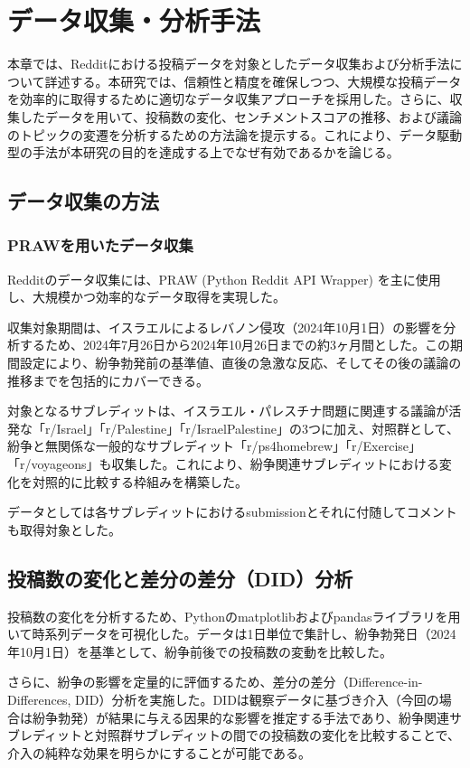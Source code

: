 \documentclass[11pt, a4j]{jreport}
\begin{document}
    \chapter{データ収集・分析手法}
    本章では、Redditにおける投稿データを対象としたデータ収集および分析手法について詳述する。本研究では、信頼性と精度を確保しつつ、大規模な投稿データを効率的に取得するために適切なデータ収集アプローチを採用した。さらに、収集したデータを用いて、投稿数の変化、センチメントスコアの推移、および議論のトピックの変遷を分析するための方法論を提示する。これにより、データ駆動型の手法が本研究の目的を達成する上でなぜ有効であるかを論じる。

    \section{データ収集の方法}
    \subsection{PRAWを用いたデータ収集}
    Redditのデータ収集には、PRAW (Python Reddit API Wrapper) を主に使用し、大規模かつ効率的なデータ取得を実現した。

    収集対象期間は、イスラエルによるレバノン侵攻（2024年10月1日）の影響を分析するため、2024年7月26日から2024年10月26日までの約3ヶ月間とした。この期間設定により、紛争勃発前の基準値、直後の急激な反応、そしてその後の議論の推移までを包括的にカバーできる。

    対象となるサブレディットは、イスラエル・パレスチナ問題に関連する議論が活発な「r/Israel」「r/Palestine」「r/IsraelPalestine」の3つに加え、対照群として、紛争と無関係な一般的なサブレディット「r/ps4homebrew」「r/Exercise」「r/voyageons」も収集した。これにより、紛争関連サブレディットにおける変化を対照的に比較する枠組みを構築した。

    データとしては各サブレディットにおけるsubmissionとそれに付随してコメントも取得対象とした。

    \section{投稿数の変化と差分の差分（DID）分析}
    投稿数の変化を分析するため、Pythonのmatplotlibおよびpandasライブラリを用いて時系列データを可視化した。データは1日単位で集計し、紛争勃発日（2024年10月1日）を基準として、紛争前後での投稿数の変動を比較した。

    さらに、紛争の影響を定量的に評価するため、差分の差分（Difference-in-Differences, DID）分析を実施した。DIDは観察データに基づき介入（今回の場合は紛争勃発）が結果に与える因果的な影響を推定する手法であり、紛争関連サブレディットと対照群サブレディットの間での投稿数の変化を比較することで、介入の純粋な効果を明らかにすることが可能である。
\end{document}
